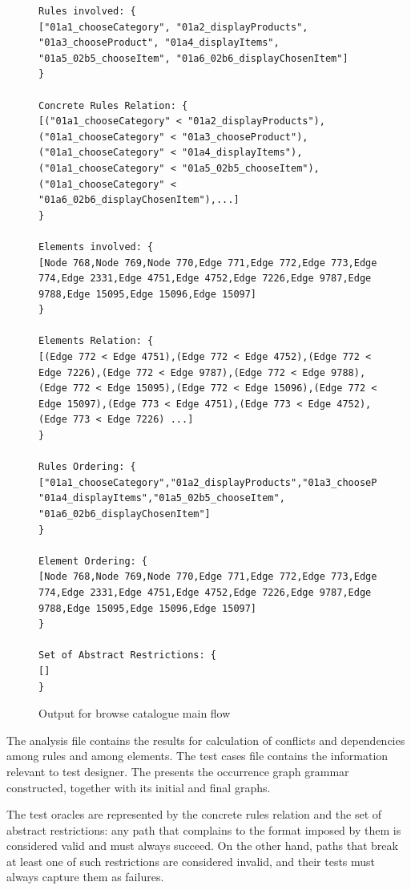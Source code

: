 \begin{figure}[!ht]
\caption{Output for browse catalogue main flow}
\begin{verbatim}
Rules involved: {
["01a1_chooseCategory", "01a2_displayProducts", "01a3_chooseProduct", "01a4_displayItems", "01a5_02b5_chooseItem", "01a6_02b6_displayChosenItem"]
}

Concrete Rules Relation: {
[("01a1_chooseCategory" < "01a2_displayProducts"), ("01a1_chooseCategory" < "01a3_chooseProduct"), ("01a1_chooseCategory" < "01a4_displayItems"), ("01a1_chooseCategory" < "01a5_02b5_chooseItem"), ("01a1_chooseCategory" < "01a6_02b6_displayChosenItem"),...]
}

Elements involved: {
[Node 768,Node 769,Node 770,Edge 771,Edge 772,Edge 773,Edge 774,Edge 2331,Edge 4751,Edge 4752,Edge 7226,Edge 9787,Edge 9788,Edge 15095,Edge 15096,Edge 15097]
}

Elements Relation: {
[(Edge 772 < Edge 4751),(Edge 772 < Edge 4752),(Edge 772 < Edge 7226),(Edge 772 < Edge 9787),(Edge 772 < Edge 9788),(Edge 772 < Edge 15095),(Edge 772 < Edge 15096),(Edge 772 < Edge 15097),(Edge 773 < Edge 4751),(Edge 773 < Edge 4752),(Edge 773 < Edge 7226) ...]
}

Rules Ordering: {
["01a1_chooseCategory","01a2_displayProducts","01a3_chooseProduct", "01a4_displayItems","01a5_02b5_chooseItem", "01a6_02b6_displayChosenItem"]
}

Element Ordering: {
[Node 768,Node 769,Node 770,Edge 771,Edge 772,Edge 773,Edge 774,Edge 2331,Edge 4751,Edge 4752,Edge 7226,Edge 9787,Edge 9788,Edge 15095,Edge 15096,Edge 15097]
}

Set of Abstract Restrictions: {
[]
}
\end{verbatim}
  \label{fig:tests:relation}
\end{figure}
The analysis file contains the results for calculation of conflicts and dependencies among rules and among elements. The test cases file contains the information relevant to test designer.
The  presents the occurrence graph grammar constructed, together with its initial and final graphs.

The test oracles are represented by the concrete rules relation and the set of abstract restrictions: any path that complains to the format imposed by them is considered valid and must always succeed. On the other hand, paths that break at least one of such restrictions are considered invalid, and their tests must always capture them as failures.

